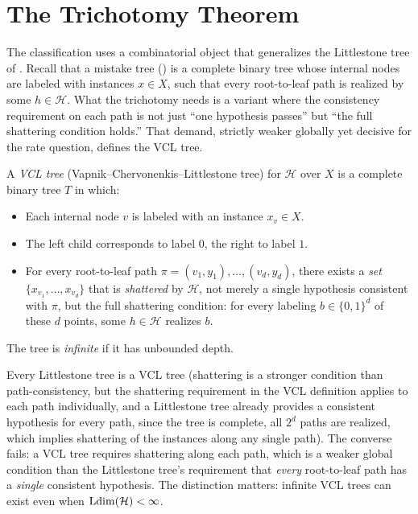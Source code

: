 
\section{The Trichotomy Theorem}
\label{sec:trichotomy}

The classification uses a combinatorial object that generalizes the
Littlestone tree of .  Recall that a mistake tree
() is a complete binary tree whose internal nodes are
labeled with instances $x \in X$, such that every root-to-leaf path is
realized by some $h \in \mathcal{H}$.  What the trichotomy needs is a
variant where the consistency requirement on each path is not just
``one hypothesis passes'' but ``the full shattering condition holds.''
That demand, strictly weaker globally yet decisive for the rate question,
defines the VCL tree.

\begin{defn}
\label{def:vcl-tree}
A \emph{VCL tree} (Vapnik--Chervonenkis--Littlestone tree) for
$\mathcal{H}$ over $X$ is a complete binary tree $T$ in which:
\begin{itemize}[leftmargin=*,itemsep=2pt]
\item Each internal node $v$ is labeled with an instance $x_v \in X$.
\item The left child corresponds to label $0$, the right to label $1$.
\item For every root-to-leaf path $\pi = (v_1, y_1), \ldots, (v_d, y_d)$,
  there exists a \emph{set} $\{x_{v_1}, \ldots, x_{v_d}\}$ that is
  \emph{shattered} by $\mathcal{H}$, not merely a single hypothesis
  consistent with $\pi$, but the full shattering condition: for every
  labeling $b \in \{0,1\}^d$ of these $d$ points, some $h \in \mathcal{H}$
  realizes $b$.
\end{itemize}
The tree is \emph{infinite} if it has unbounded depth.
\end{defn}

\begin{remark}
\label{rmk:vcl-vs-littlestone}
Every Littlestone tree is a VCL tree (shattering is a stronger condition
than path-consistency, but the shattering requirement in the VCL definition
applies to each path individually, and a Littlestone tree already provides a
consistent hypothesis for every path, since the tree is complete, all
$2^d$ paths are realized, which implies shattering of the instances along
any single path).  The converse fails: a VCL tree requires shattering along
each path, which is a weaker global condition than the Littlestone tree's
requirement that \emph{every} root-to-leaf path has a \emph{single}
consistent hypothesis.  The distinction matters: infinite VCL trees can
exist even when $\mathrm{Ldim}(\mathcal{H}) < \infty$.
\end{remark}

